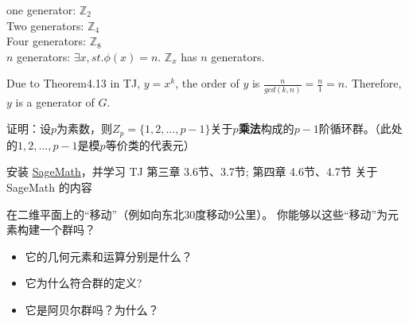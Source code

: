 \documentclass[a4paper, justified]{tufte-handout}
\begin{document}
\begin{problem}[TJ 4-12]
\end{problem}

\begin{solution}
one generator: $\mathbb{Z}_2$\\
Two generators: $\mathbb{Z}_4$\\
Four generators: $\mathbb{Z}_8$\\
$n$ generators: $\exists x, st. \phi(x)=n$. $\mathbb{Z}_{x}$ has $n$ generators.
\end{solution}

\begin{problem}[TJ 4-32]
\end{problem}

\begin{solution}
Due to Theorem4.13 in TJ, $y=x^{k}$, the order of $y$ is $\frac{n}{gcd(k,n)}=\frac{n}{1}=n$. Therefore, $y$ is a generator of $G$.
\end{solution}

\beginoptional

\begin{problem}[$Z_p$]
证明：设$p$为素数，则$Z_p=\{1,2,...,p-1\}$关于$p$\textbf{乘法}构成的$p-1$阶循环群。（此处的$1,2,...,p-1$是模$p$等价类的代表元）
\end{problem}

\begin{solution}
\end{solution}

\begin{problem}[SageMath学习]
安装 \href{https://www.sagemath.org/}{SageMath}，并学习 TJ 第三章 3.6节、3.7节; 第四章 4.6节、4.7节 关于 SageMath 的内容
\end{problem}

\begin{solution}
\end{solution}

\beginot

在二维平面上的``移动''（例如向东北30度移动9公里）。
	你能够以这些``移动''为元素构建一个群吗？
\begin{ot}[``移动''群-1]	
	\begin{itemize}
	\item 它的几何元素和运算分别是什么？
	\item 它为什么符合群的定义?
	\item 它是阿贝尔群吗？为什么？
	\end{itemize}
\end{ot}
\end{document}
